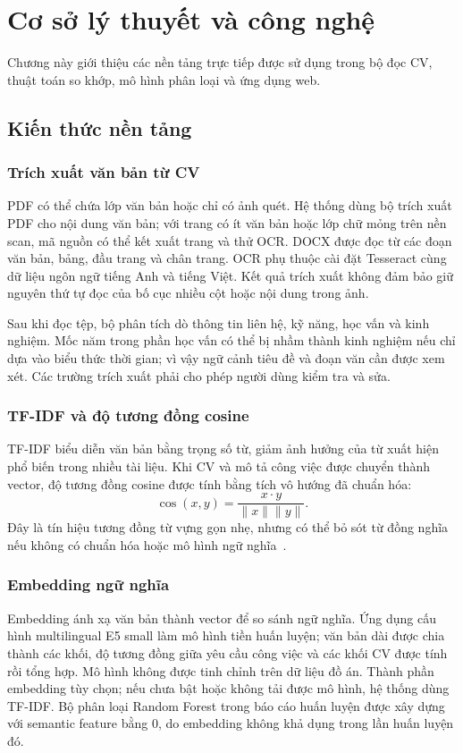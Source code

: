 \chapter{Cơ sở lý thuyết và công nghệ}
\label{ch:coso}

\begin{muctieu}
Chương này giới thiệu các nền tảng trực tiếp được sử dụng trong bộ đọc CV, thuật toán so khớp, mô hình phân loại và ứng dụng web.
\end{muctieu}

\section{Kiến thức nền tảng}
\subsection{Trích xuất văn bản từ CV}
PDF có thể chứa lớp văn bản hoặc chỉ có ảnh quét. Hệ thống dùng bộ trích xuất PDF cho nội dung văn bản; với trang có ít văn bản hoặc lớp chữ mỏng trên nền scan, mã nguồn có thể kết xuất trang và thử OCR. DOCX được đọc từ các đoạn văn bản, bảng, đầu trang và chân trang. OCR phụ thuộc cài đặt Tesseract cùng dữ liệu ngôn ngữ tiếng Anh và tiếng Việt. Kết quả trích xuất không đảm bảo giữ nguyên thứ tự đọc của bố cục nhiều cột hoặc nội dung trong ảnh.

Sau khi đọc tệp, bộ phân tích dò thông tin liên hệ, kỹ năng, học vấn và kinh nghiệm. Mốc năm trong phần học vấn có thể bị nhầm thành kinh nghiệm nếu chỉ dựa vào biểu thức thời gian; vì vậy ngữ cảnh tiêu đề và đoạn văn cần được xem xét. Các trường trích xuất phải cho phép người dùng kiểm tra và sửa.

\subsection{TF-IDF và độ tương đồng cosine}
TF-IDF biểu diễn văn bản bằng trọng số từ, giảm ảnh hưởng của từ xuất hiện phổ biến trong nhiều tài liệu. Khi CV và mô tả công việc được chuyển thành vector, độ tương đồng cosine được tính bằng tích vô hướng đã chuẩn hóa:
\begin{equation}
\operatorname{cos}(x,y)=\frac{x\cdot y}{\lVert x\rVert\lVert y\rVert}.
\end{equation}
Đây là tín hiệu tương đồng từ vựng gọn nhẹ, nhưng có thể bỏ sót từ đồng nghĩa nếu không có chuẩn hóa hoặc mô hình ngữ nghĩa~\cite{Manning2008}.

\subsection{Embedding ngữ nghĩa}
Embedding ánh xạ văn bản thành vector để so sánh ngữ nghĩa. Ứng dụng cấu hình multilingual E5 small làm mô hình tiền huấn luyện; văn bản dài được chia thành các khối, độ tương đồng giữa yêu cầu công việc và các khối CV được tính rồi tổng hợp. Mô hình không được tinh chỉnh trên dữ liệu đồ án. Thành phần embedding tùy chọn; nếu chưa bật hoặc không tải được mô hình, hệ thống dùng TF-IDF. Bộ phân loại Random Forest trong báo cáo huấn luyện được xây dựng với semantic feature bằng 0, do embedding không khả dụng trong lần huấn luyện đó.

